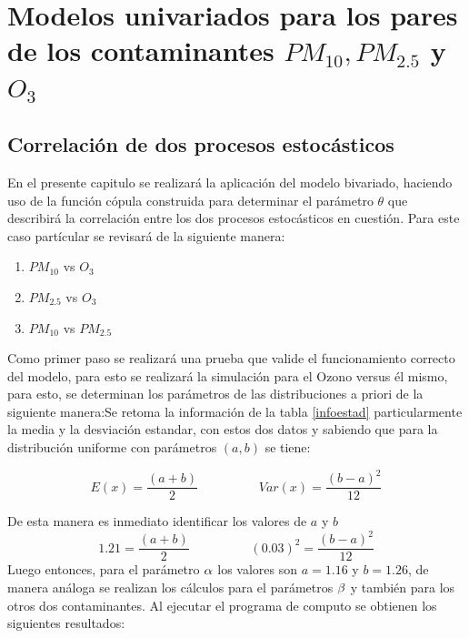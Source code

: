 \chapter{Modelos univariados para los pares de los contaminantes  $PM_{10}, PM_{2.5}$ y $O_3$}


\section{Correlación de dos procesos estocásticos}

En el presente capitulo se realizará la aplicación del modelo bivariado, haciendo uso de la función cópula construida para determinar el parámetro $\theta$ que describirá la correlación entre los dos procesos estocásticos en cuestión. Para este caso partícular se revisará de la siguiente manera: 
\begin{enumerate}
\item $PM_{10}$ vs $O_3$
\item $PM_{2.5}$ vs $O_3$
\item $PM_{10}$ vs $PM_{2.5}$
\end{enumerate}

Como primer paso se realizará una prueba que valide el funcionamiento correcto del modelo, para esto se realizará la simulación para el Ozono versus él mismo, para esto, se determinan los parámetros de las distribuciones a priori de la siguiente manera:Se retoma la información de la tabla \ref{infoestad} particularmente la media y la desviación estandar, con estos dos datos y sabiendo que para la distribución uniforme con parámetros $(a,b)$ se tiene: 

$$E(x)=\frac{(a+b)}{2}\hspace{2cm} Var(x)=\frac{(b-a)^2}{12} $$

De esta manera es inmediato identificar los valores de $a$ y $b$
$$1.21=\frac{(a+b)}{2}\hspace{2cm} (0.03)^2=\frac{(b-a)^2}{12} $$
Luego entonces, para el parámetro $\alpha$ los valores son $a=1.16$ y $b=1.26$, de manera análoga se realizan los cálculos para el parámetros $\beta$ y también para los otros dos contaminantes. Al ejecutar el programa de computo se obtienen los siguientes resultados:


